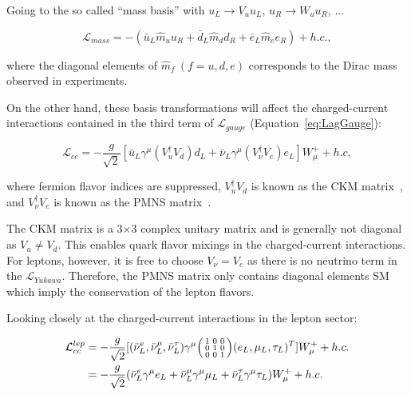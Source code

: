 Going to the so called ``mass basis'' with $u_{L}\rightarrow V_{u}u_{L}$, $u_{R}\rightarrow W_{u}u_{R}$, ...

\begin{equation}
\mathcal{L}_{mass}=-(\bar{u}_{L}\hat{m}_{u}u_{R}+\bar{d}_{L}\hat{m}_{d}d_{R}+\bar{e}_{L}\hat{m}_{e}e_{R}) + h.c.,
\end{equation}

where the diagonal elements of $\hat{m}_{f}~(f=u,d,e)$ corresponds to the Dirac mass observed in experiments. 

On the other hand, these basis transformations will affect the charged-current interactions contained in the third term of $\mathcal{L}_{gauge}$ (Equation~\ref{eq:LagGauge}):

\begin{equation}
\label{eq:LCC}
\mathcal{L}_{cc}=-\frac{g}{\sqrt{2}}[\bar{u}_{L}\gamma^{\mu}(V_{u}^{\dagger}V_{d})d_{L}+\bar{\nu}_{L}\gamma^{\mu}(V_{\nu}^{\dagger}V_{e})e_{L}]W_{\mu}^{+} + h.c, 
\end{equation}

where fermion flavor indices are suppressed, $V_{u}^{\dagger}V_{d}$ is known as the \ac{CKM} matrix~\cite{Cabibbo:1963yz,Kobayashi:1973fv}, and $V_{\nu}^{\dagger}V_{e}$ is known as the \ac{PMNS} matrix~\cite{Pontecorvo:1957cp,Maki:1962mu}. 

The \ac{CKM} matrix is a 3$\times$3 complex unitary matrix and is generally not diagonal as $V_{u}\neq V_{d}$. This enables quark flavor mixings in the charged-current interactions. For leptons, however, it is free to choose $V_{\nu}=V_{e}$ as there is no neutrino term in the $\mathcal{L}_{Yukawa}$. Therefore, the \ac{PMNS} matrix only contains diagonal elements \ac{SM} which imply the conservation of the lepton flavors.  

Looking closely at the charged-current interactions in the lepton sector:

\begin{equation}
\label{eq:LepCC}
\begin{split}
\mathcal{L}_{cc}^{lep}&=-\frac{g}{\sqrt{2}}[(\bar{\nu}_{L}^{e},\bar{\nu}_{L}^{\mu},\bar{\nu}^{\tau}_{L})\gamma^{\mu}\begin{psmallmatrix}1&0&0\\0&1&0\\0&0&1\end{psmallmatrix}(e_{L},\mu_{L},\tau_{L})^{T}]W_{\mu}^{+} + h.c.\\
&=-\frac{g}{\sqrt{2}}(\bar{\nu}_{L}^{e}\gamma^{\mu}e_{L}+\bar{\nu}_{L}^{\mu}\gamma^{\mu}\mu_{L}+\bar{\nu}_{L}^{\tau}\gamma^{\mu}\tau_{L})W^{+}_{\mu} + h.c.
\end{split}
\end{equation}

